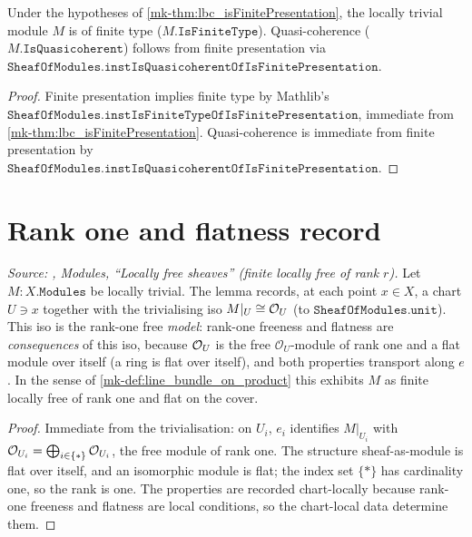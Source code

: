 \begin{corollary}\label{mk-cor:lbc_isFiniteType}
  \leanok

  Under the hypotheses of \ref{mk-thm:lbc_isFinitePresentation}, the locally
  trivial module \(M\) is of finite type (\(M.\mathtt{IsFiniteType}\)). Quasi-coherence
  (\(M.\mathtt{IsQuasicoherent}\)) follows from finite presentation via
  \(\mathtt{SheafOfModules.instIsQuasicoherentOfIsFinitePresentation}\).
\end{corollary}

\begin{proof}
  \leanok
  Finite presentation implies finite type by Mathlib's
  \(\mathtt{SheafOfModules.instIsFiniteTypeOfIsFinitePresentation}\), immediate
  from \ref{mk-thm:lbc_isFinitePresentation}. Quasi-coherence is immediate from
  finite presentation by
  \(\mathtt{SheafOfModules.instIsQuasicoherentOfIsFinitePresentation}\).
\end{proof}

\section{Rank one and flatness record}
\label{mk-sec:lbc_rank_flat}

\begin{lemma}\label{mk-lem:lbc_rank_flat}
  \leanok

  \textit{Source: \cite{stacks-project}, Modules, ``Locally free sheaves'' (finite
  locally free of rank \(r\)).}
  Let \(M : X.\mathtt{Modules}\) be locally trivial. The lemma records, at each
  point \(x \in X\), a chart \(U \ni x\) together with the trivialising iso
  \(M|_U \cong \mathcal{O}_{U}\) (to \(\mathtt{SheafOfModules.unit}\)). This iso is the
  rank-one free \emph{model}: rank-one freeness and flatness are
  \emph{consequences} of this iso, because \(\mathcal{O}_{U}\) is the free
  \(\mathcal{O}_U\)-module of rank one and a flat module over itself (a ring is
  flat over itself), and both properties transport along \(e\). In the sense of
  \ref{mk-def:line_bundle_on_product} this exhibits \(M\) as finite locally free
  of rank one and flat on the cover.
\end{lemma}

\begin{proof}
  \leanok
  Immediate from the trivialisation: on \(U_i\), \(e_i\) identifies \(M|_{U_i}\)
  with \(\mathcal{O}_{U_i} = \bigoplus_{i \in \{*\}} \mathcal{O}_{U_i}\), the free module
  of rank one. The structure sheaf-as-module is flat over itself, and an
  isomorphic module is flat; the index set \(\{*\}\) has cardinality one, so the
  rank is one. The properties are recorded chart-locally because rank-one
  freeness and flatness are local conditions, so the chart-local data determine
  them.
\end{proof}
